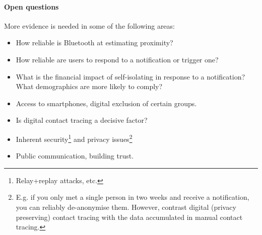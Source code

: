 \paragraph{Open questions}
More evidence is needed in some of the following areas:
\begin{itemize}
	\item How reliable is Bluetooth at estimating proximity?
	\item How reliable are users to respond to a notification or trigger one?
	\item What is the financial impact of self-isolating in response to a notification?
	      What demographics are more likely to comply?
	\item Access to smartphones, digital exclusion of certain groups.
	\item Is digital contact tracing a decisive factor?
	\item Inherent security\footnote{Relay+replay attacks, etc.} and privacy
	      issues\footnote{E.g. if you only met a single person in two weeks and receive a
		      notification, you can reliably de-anonymise them. However, contrast digital
		      (privacy preserving) contact tracing with the data accumulated in manual
		      contact tracing.}
	\item Public communication, building trust.
\end{itemize}